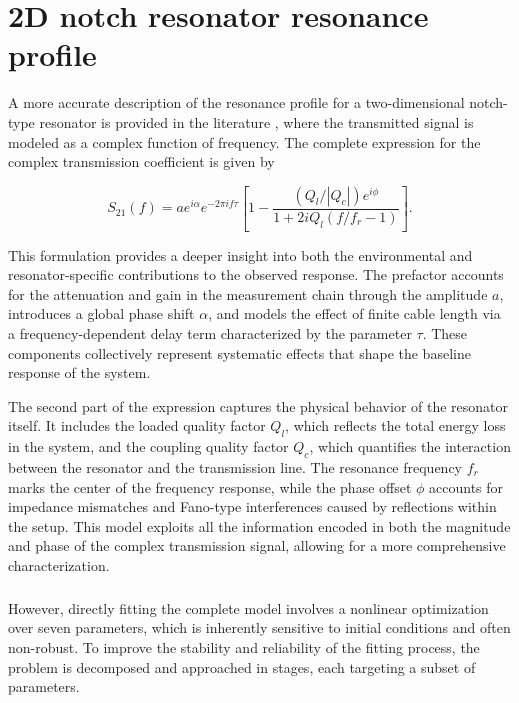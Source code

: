 \appendix

\chapter{2D notch resonator resonance profile} 
\label{app:res_low}

A more accurate description of the resonance profile for a two-dimensional notch-type resonator is provided in the literature \cite{Gao2008}, where the transmitted signal is modeled as a complex function of frequency. 
The complete expression for the complex transmission coefficient is given by

\begin{equation}
S_{21}(f) = ae^{i\alpha}e^{-2\pi i f \tau}\left[ 1 - \frac{(Q_l/|Q_c|)e^{i\phi}}{1 + 2iQ_l(f/f_r -1)} \right].
\end{equation}

This formulation provides a deeper insight into both the environmental and resonator-specific contributions to the observed response. 
The prefactor accounts for the attenuation and gain in the measurement chain through the amplitude $a$, introduces a global phase shift $\alpha$, and models the effect of finite cable length via a frequency-dependent delay term characterized by the parameter $\tau$. 
These components collectively represent systematic effects that shape the baseline response of the system.

The second part of the expression captures the physical behavior of the resonator itself. 
It includes the loaded quality factor $Q_l$, which reflects the total energy loss in the system, and the coupling quality factor $Q_c$, which quantifies the interaction between the resonator and the transmission line. 
The resonance frequency $f_r$ marks the center of the frequency response, while the phase offset $\phi$ accounts for impedance mismatches and Fano-type interferences caused by reflections within the setup.
This model exploits all the information encoded in both the magnitude and phase of the complex transmission signal, allowing for a more comprehensive characterization. 

\paragraph{}
However, directly fitting the complete model involves a nonlinear optimization over seven parameters, which is inherently sensitive to initial conditions and often non-robust. 
To improve the stability and reliability of the fitting process, the problem is decomposed and approached in stages, each targeting a subset of parameters.

